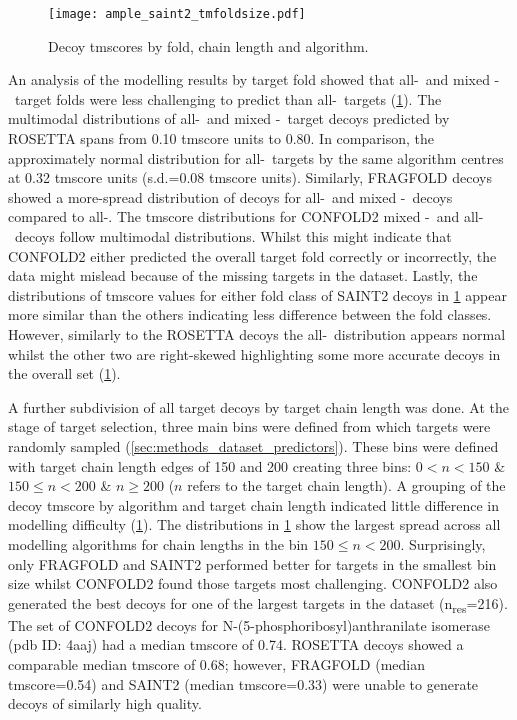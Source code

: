 \begin{figure}[H]
    \centering
    \texttt{[image: ample\_saint2\_tmfoldsize.pdf]}
    \caption[Decoy TM-scores by fold, chain length and algorithm]{Decoy \gls{tmscore}s by fold, chain length and algorithm.}
    \label{fig:ample_saint2_tmfoldsize}
\end{figure}

An analysis of the modelling results by target fold showed that all-\textalpha\ and mixed \textalpha-\textbeta\ target folds were less challenging to predict than all-\textbeta\ targets (\cref{fig:ample_saint2_tmfoldsize}). The multimodal distributions of all-\textalpha\ and mixed \textalpha-\textbeta\ target decoys predicted by ROSETTA spans from 0.10 \gls{tmscore} units to 0.80. In comparison, the approximately normal distribution for all-\textbeta\ targets by the same algorithm centres at 0.32 \gls{tmscore} units (s.d.=0.08 \gls{tmscore} units). Similarly, FRAGFOLD decoys showed a more-spread distribution of decoys for all-\textalpha\ and mixed \textalpha-\textbeta\ decoys compared to all-\textbeta. The \gls{tmscore} distributions for CONFOLD2 mixed \textalpha-\textbeta\ and all-\textbeta\ decoys follow multimodal distributions. Whilst this might indicate that CONFOLD2 either predicted the overall target fold correctly or incorrectly, the data might mislead because of the missing targets in the dataset. Lastly, the distributions of \gls{tmscore} values for either fold class of SAINT2 decoys in \cref{fig:ample_saint2_tmfoldsize} appear more similar than the others indicating less difference between the fold classes. However, similarly to the ROSETTA decoys the all-\textbeta\ distribution appears normal whilst the other two are right-skewed highlighting some more accurate decoys in the overall set (\cref{fig:ample_saint2_tmfoldsize}).

A further subdivision of all target decoys by target chain length was done. At the stage of target selection, three main bins were defined from which targets were randomly sampled (\cref{sec:methods_dataset_predictors}). These bins were defined with target chain length edges of 150 and 200 creating three bins: $0 < n < 150$ \& $150 \leq n < 200$ \& $n \geq 200$ ($n$ refers to the target chain length). A grouping of the decoy \gls{tmscore} by algorithm and target chain length indicated little difference in modelling difficulty (\cref{fig:ample_saint2_tmfoldsize}). The distributions in \cref{fig:ample_saint2_tmfoldsize} show the largest spread across all modelling algorithms for chain lengths in the bin $150 \leq n < 200$. Surprisingly, only FRAGFOLD and SAINT2 performed better for targets in the smallest bin size whilst CONFOLD2 found those targets most challenging. CONFOLD2 also generated the best decoys for one of the largest targets in the dataset (n\textsubscript{res}=216). The set of CONFOLD2 decoys for N-(5-phosphoribosyl)anthranilate isomerase (\gls{pdb} ID: 4aaj) had a median \gls{tmscore} of 0.74. ROSETTA decoys showed a comparable median \gls{tmscore} of 0.68; however, FRAGFOLD (median \gls{tmscore}=0.54) and SAINT2 (median \gls{tmscore}=0.33) were unable to generate decoys of similarly high quality.

